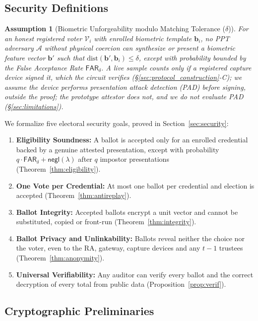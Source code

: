 \documentclass[10pt,letterpaper,journal]{IEEEtran}
\newtheorem{assumption}[theorem]{Assumption}
\begin{document}
\subsection{Security Definitions}

\begin{assumption}[Biometric Unforgeability modulo Matching Tolerance ($\delta$)]
\label{asm:uncloneable}
For an honest registered voter $\mathcal{V}_i$ with enrolled biometric template $\mathbf{b}_i$, no PPT adversary $\mathcal{A}$ without physical coercion can synthesize or present a biometric feature vector $\mathbf{b}'$ such that $\mathrm{dist}(\mathbf{b}', \mathbf{b}_i) \leq \delta$, except with probability bounded by the False Acceptance Rate $\mathsf{FAR}_\delta$. A live sample counts only if a registered capture device signed it, which the circuit verifies (\S\ref{sec:protocol_construction}-C); we assume the device performs presentation attack detection (PAD) before signing, outside the proof; the prototype attestor does not, and we do not evaluate PAD (\S\ref{sec:limitations}).
\end{assumption}

We formalize five electoral security goals, proved in Section~\ref{sec:security}:
\begin{enumerate}[leftmargin=*,noitemsep,topsep=1pt,parsep=0pt]
    \item \textbf{Eligibility Soundness:} A ballot is accepted only for an enrolled credential backed by a genuine attested presentation, except with probability $q \cdot \mathsf{FAR}_\delta + \mathsf{negl}(\lambda)$ after $q$ impostor presentations (Theorem~\ref{thm:eligibility}).
    \item \textbf{One Vote per Credential:} At most one ballot per credential and election is accepted (Theorem~\ref{thm:antireplay}).
    \item \textbf{Ballot Integrity:} Accepted ballots encrypt a unit vector and cannot be substituted, copied or front-run (Theorem~\ref{thm:integrity}).
    \item \textbf{Ballot Privacy and Unlinkability:} Ballots reveal neither the choice nor the voter, even to the RA, gateway, capture devices and any $t-1$ trustees (Theorem~\ref{thm:anonymity}).
    \item \textbf{Universal Verifiability:} Any auditor can verify every ballot and the correct decryption of every total from public data (Proposition~\ref{prop:verif}).
\end{enumerate}


\subsection{Cryptographic Preliminaries}
\end{document}
